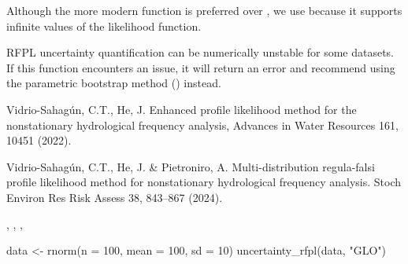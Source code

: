 \documentclass[a4paper]{book}
\begin{document}
%
\begin{Note}
Although the more modern  function is preferred over
, we use  because it supports infinite
values of the likelihood function.

RFPL uncertainty quantification can be numerically unstable for some datasets.
If this function encounters an issue, it will return an error and recommend
using the parametric bootstrap method () instead.
\end{Note}
%
\begin{References}
Vidrio-Sahagún, C.T., He, J. Enhanced profile likelihood method for the nonstationary
hydrological frequency analysis, Advances in Water Resources 161, 10451 (2022).

Vidrio-Sahagún, C.T., He, J. \& Pietroniro, A. Multi-distribution regula-falsi profile
likelihood method for nonstationary hydrological frequency analysis. Stoch Environ Res
Risk Assess 38, 843–867 (2024). 
\end{References}
%
\begin{SeeAlso}
, ,
, 
\end{SeeAlso}
%
\begin{Examples}
\begin{ExampleCode}
data <- rnorm(n = 100, mean = 100, sd = 10)
uncertainty_rfpl(data, "GLO")

\end{ExampleCode}
\end{Examples}
\printindex{}
\end{document}
